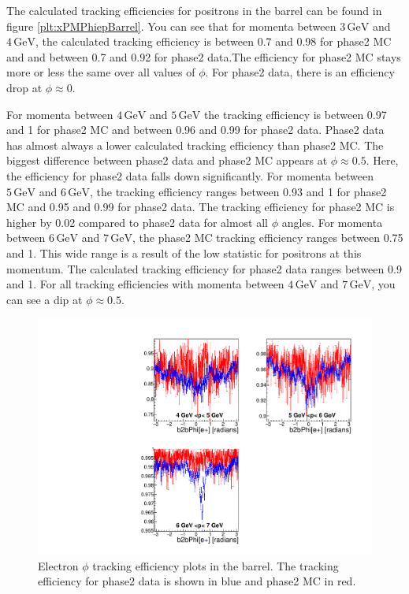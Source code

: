 \documentclass[a4paper,11pt,twosided,final,german,openbib,pdftex,listof=totoc,bibliography=totoc]{scrbook}
\begin{document}
The calculated tracking efficiencies for positrons in the barrel can be found in figure \ref{plt:xPMPhiepBarrel}. You can see that for momenta between $3\,\textrm{GeV}$ and $4\,\textrm{GeV}$, the calculated tracking efficiency is between 0.7 and 0.98 for phase2 MC and and between 0.7 and 0.92 for phase2 data.The efficiency for phase2 MC stays more or less the same over all values of $\phi$. For phase2 data, there is an efficiency drop at $\phi \approx 0$.

For momenta between $4\,\textrm{GeV}$ and $5\,\textrm{GeV}$ the tracking efficiency is between 0.97 and 1 for phase2 MC and between 0.96 and 0.99 for phase2 data. Phase2 data has almost always a lower calculated tracking efficiency than phase2 MC.
The biggest difference between phase2 data and phase2 MC appears at $\phi \approx 0.5$. Here, the efficiency for phase2 data falls down significantly. 
For momenta between $5\,\textrm{GeV}$ and $6\,\textrm{GeV}$, the tracking efficiency ranges between 0.93 and 1 for phase2 MC and 0.95  and 0.99 for phase2 data. The tracking efficiency for phase2 MC is higher by 0.02 compared to phase2 data for almost all $\phi$ angles. 
For momenta between $6\,\textrm{GeV}$ and $7\,\textrm{GeV}$, the phase2 MC tracking efficiency ranges between 0.75 and 1. This wide range is a result of the low statistic for positrons at this momentum. The calculated tracking efficiency for phase2 data ranges between 0.9 and 1. For all tracking efficiencies with momenta between $4\,\textrm{GeV}$ and $7\,\textrm{GeV}$, you can see a dip at $\phi \approx 0.5$.



\begin{figure}[!htbp]
	\centering
	\includegraphics[width=\textwidth]{Plots/master/xPMPhiemBarrel}
	\caption[Momentum $\phi$ Electron Barrel Efficiency Phase2]{Electron $\phi$ tracking efficiency plots in the barrel. The tracking efficiency for phase2 data is shown in blue and phase2 MC in red.}
	\label{plt:xPMPhiemBarrel}
\end{figure}
\end{document}
